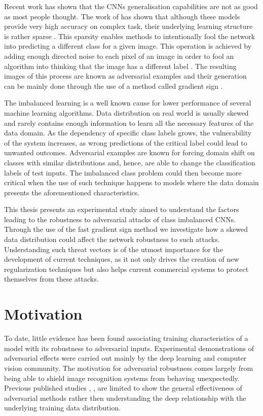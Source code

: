 Recent work has shown that the CNNs generalisation capabilities are not as good as most people thought. The work of \cite{goodfellow2014} has shown that although these models provide very high accuracy on complex task, their underlying learning structure is rather sparse \cite{papernot2016}. This sparsity enables methods to intentionally fool the network into predicting a different class for a given image. This operation is achieved by adding enough directed noise to each pixel of an image in order to fool an algorithm into thinking that the image has a different label \cite{goodfellow2014}\cite{papernot2016transf}\cite{goodfellow2016}\cite{szegedy2013}. The resulting images of this process are known as adversarial examples and their generation can be mainly done through the use of a method called gradient sign \cite{goodfellow2014}.

The imbalanced learning is a well known cause for lower performance of several machine learning algorithms. Data distribution on real world is usually skewed and rarely contains enough information to learn all the necessary features of the data domain. As the dependency of specific class labels grows, the vulnerability of the system increases, as wrong predictions of the critical label could lead to unwanted outcomes. Adversarial examples are known for forcing domain shift on classes with similar distributions and, hence, are able to change the classification labels of test inputs. The imbalanced class problem could then become more critical when the use of such technique happens to models where the data domain presents the aforementioned characteristics.

This thesis presents an experimental study aimed to understand the factors leading to the robustness to adversarial attacks of  class imbalanced CNNs. Through the use of the fast gradient sign method we investigate how a skewed data distribution could affect the network robustness to such attacks. Understanding such threat vectors is of the utmost importance for the development of current techniques, as it not only drives the creation of new regularization techniques but also helps current commercial systems to protect themselves from these attacks.


\section{Motivation}

To date, little evidence has been found associating training characteristics of a model with its robustness to adversarial inputs. Experimental demonstrations of adversarial effects were carried out mainly by the deep learning and computer vision community. The motivation for adversarial robustness comes largely from being able to shield image recognition systems from behaving unexpectedly. Previous published studies \cite{papernot2016}, \cite{goodfellow2014}, \cite{billovits} are limited to show the general effectiveness of adversarial methods rather then understanding the deep relationship with the underlying training data distribution.

